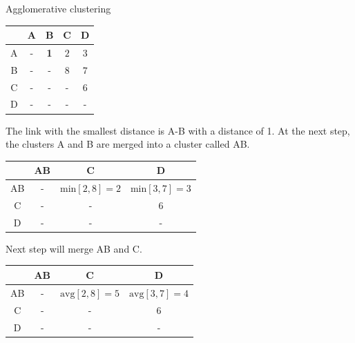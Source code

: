 \begin{example}
  \small
  \centering
  \caption{Agglomerative clustering}
  \label{ex:agglomerative_clustering}

  \begin{subexample}{\linewidth}
    \centering
    \begin{tabular}{c|c c c c}
      \toprule
        & A & B & C & D \\
      \midrule
      A & - & \textbf{1} & $2$ & $3$ \\
      B & - & - & $8$ & $7$\\
      C & - & - & - & $6$ \\
      D & - & - & - & - \\
      \bottomrule
    \end{tabular}
  \end{subexample}

  \vspace{0.2cm}
  The link with the smallest distance is A-B with a distance of 1.
  At the next step, the clusters A and B are merged into a cluster called AB.

  \vspace{0.5cm}

  \begin{subexample}{\linewidth}
    \centering
    \begin{tabular}{c|c c c}
      \toprule
        & AB & C & D \\
      \midrule
      AB & - & $\text{min} \left[2, 8 \right] = 2$ & $\text{min} \left[3, 7 \right] = 3$ \\
      C  & - & - & $6$ \\
      D  & - & - & - \\
      \bottomrule
    \end{tabular}
  \end{subexample}

  \vspace{0.2cm}
  Next step will merge AB and C.

  \vspace{0.5cm}

  \begin{subexample}{\linewidth}
    \centering
    \begin{tabular}{c|c c c}
      \toprule
        & AB & C & D \\
      \midrule
      AB & - & $\text{avg} \left[2, 8 \right] = 5$ & $\text{avg} \left[3, 7 \right] = 4$ \\
      C  & - & - & $6$ \\
      D  & - & - & - \\
      \bottomrule
    \end{tabular}
  \end{subexample}


\end{example}
